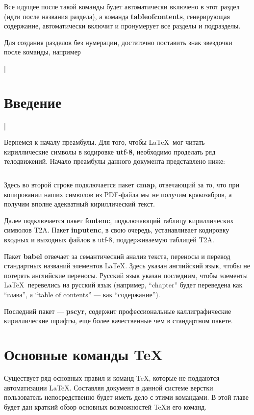 Все идущее после такой команды будет автоматически включено в этот раздел (идти после названия раздела), а команда \textbf{tableofcontents}, генерирующая содержание, автоматически включит и пронумерует все разделы и подразделы.

Для создания разделов без нумерации, достаточно поставить знак звездочки после команды, например

|\section*{Введение}|

Вернемся к началу преамбулы. Для того, чтобы \LaTeX~мог читать кириллические символы в кодировке \textbf{utf-8}, необходимо проделать ряд телодвижений. Начало преамбулы данного документа представлено ниже:

\inputminted[breaklines,firstline=1,lastline=6,fontsize=\small]{latex}{../preamble.tex}

Здесь во второй строке подключается пакет \textbf{cmap}, отвечающий за то, что при копировании наших символов из PDF-файла мы не получим крякозябров, а получим вполне адекватный кириллический текст.

Далее подключается пакет \textbf{fontenc}, подключающий таблицу кириллических символов T2A. Пакет \textbf{inputenc}, в свою очередь, устанавливает кодировку входных и выходных файлов в utf-8, поддерживаемую таблицей T2A.

Пакет \textbf{babel} отвечает за семантический анализ текста, переносы и перевод стандартных названий элементов \LaTeX. Здесь указан английский язык, чтобы не потерять английские переносы. Русский язык указан последним, чтобы элементы \LaTeX~перевелись на русский язык (например, ``chapter'' будет переведена как ``глава'', а ``table of contents'' --- как ``содержание'').

Последний пакет --- \textbf{pscyr}, содержит профессиональные каллиграфические кириллические шрифты, еще более качественные чем в стандартном пакете.

\section{Основные команды \TeX}

Существует ряд основных правил и команд \TeX, которые не поддаются автоматизации \LaTeX. Составляя документ в данной системе верстки пользователь непосредственно будет иметь дело с этими командами. В этой главе будет дан краткий обзор основных возможностей \TeX и его команд.

